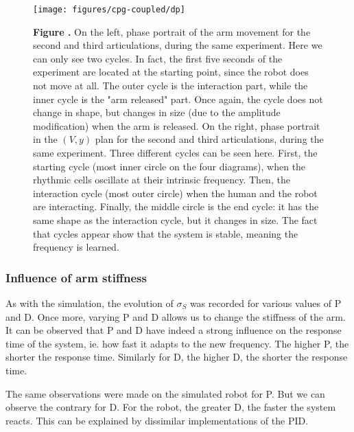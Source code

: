 \begin{figure}[h!]
\begin{center}
\texttt{[image: figures/cpg-coupled/dp]}
\end{center}
\textbf{\label{fig:19} Figure .}{ On the left, phase portrait of the arm movement for the second and third articulations, during the same experiment. Here we can only see two cycles. In fact, the first five seconds of the experiment are located at the starting point, since the robot does not move at all. The outer cycle is the interaction part, while the inner cycle is the "arm released" part. Once again, the cycle does not change in shape, but changes in size (due to the amplitude modification) when the arm is released. 
On the right, phase portrait in the $(V, y)$ plan for the second and third articulations, during the same experiment. Three different cycles can be seen here. First, the starting cycle (most inner circle on the four diagrams), when the rhythmic cells oscillate at their intrinsic frequency. Then, the interaction cycle (most outer circle) when the human and the robot are interacting. Finally, the middle circle is the end cycle: it has the same shape as the interaction cycle, but it changes in size. The fact that cycles appear show that the system is stable, meaning the frequency is learned.}
\end{figure}

\subsubsection{Influence of arm stiffness}

As with the simulation, the evolution of $\sigma_S$ was recorded for various values of P and D. Once more, varying P and D allows us to change the stiffness of the arm. It can be observed that P and D have indeed a strong influence on the response time of the system, ie. how fast it adapts to the new frequency. The higher P, the shorter the response time. Similarly for D, the higher D, the shorter the response time. 

The same observations were made on the simulated robot for P. But we can observe the contrary for D. For the robot, the greater D, the faster the system reacts. This can be explained by dissimilar implementations of the PID.

